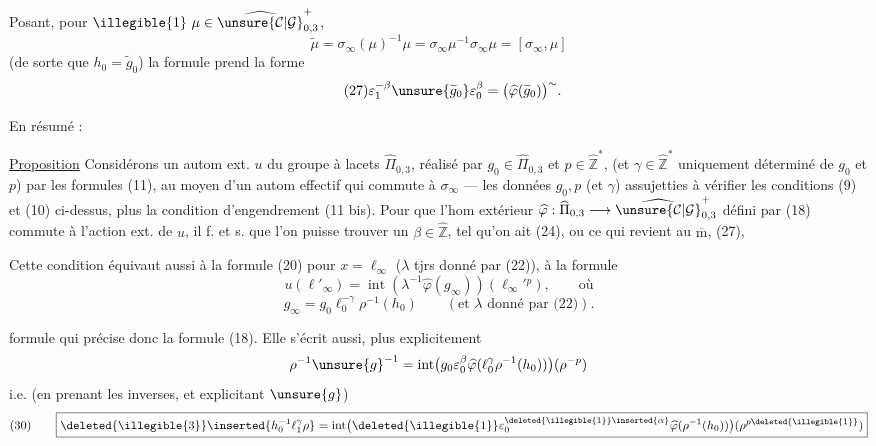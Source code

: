 Posant, pour $\illegible{1}\ \mu\in
\widehat{\unsure{\mathcal C|\mathcal G}}_{0,3}^{+}$,
\[
\tag{26}
\widetilde\mu=\sigma_\infty(\mu)^{-1}\mu
=\sigma_\infty\mu^{-1}\sigma_\infty\mu=[\sigma_\infty,\mu]
\]
(de sorte que $h_0=\widetilde g_0$) la formule  prend la forme
\[
\tag{27}
\varepsilon_1^{-\beta}\unsure{\widetilde g_0}\varepsilon_0^\beta
=\bigl(\widehat\varphi(\widetilde g_0)\bigr)^{\sim}.
\]


En résumé :

\uline{Proposition} Considérons un autom ext. $u$ du groupe à lacets
$\widehat\Pi_{0,3}$, réalisé par $g_0\in\widehat\Pi_{0,3}$
et $p\in\widehat{\mathbb Z}^{*}$,
(et $\gamma\in\widehat{\mathbb Z}^{*}$ uniquement déterminé
 de $g_0$ et $p$)
par les formules (11), au moyen d'un autom effectif
 qui commute à $\sigma_\infty$ ---
les données $g_0,p$ (et $\gamma$)  
assujetties à vérifier les conditions (9) et (10) ci-dessus,
plus la condition d'engendrement (11 bis).
Pour que l'hom extérieur
$\widehat\varphi:\widehat\Pi_{0,3}\longrightarrow
\widehat{\unsure{\mathcal C|\mathcal G}}_{0,3}^{+}$
défini par (18) commute à l'action ext. de $u$,
il f. et s. que l'on puisse trouver un $\beta\in\widehat{\mathbb Z}$,
tel qu'on ait (24), ou ce qui revient au $\overline{\mathrm m}$, (27),

Cette condition  équivaut aussi à la formule
(20) pour $x=\ell_\infty$ ($\lambda$  tjrs donné par (22)),
  à la formule
\[
\tag{28}
u(\ell'_\infty)=\operatorname{int}(\lambda^{-1}\widehat\varphi(g_\infty))
 (\ell_\infty'{}^p),\qquad\text{où}
\]
\[
\tag{29}
g_\infty=g_0\ell_0^{-\gamma}\rho^{-1}(h_0)
\qquad(\text{et }\lambda\text{ donné par (22)}).
\]


formule qui précise donc la formule  (18). Elle s'écrit aussi, plus explicitement
\[
\rho^{-1}\unsure{g}^{-1}
=\operatorname{int}\bigl(g_0\varepsilon_0^{\beta}
\widehat\varphi(\ell_0^{\gamma}\rho^{-1}(h_0))\bigr)
(\rho^{-p})
\]
i.e. (en prenant les inverses, et explicitant $\unsure{g}$)
\[
(30)\qquad
\boxed{
\deleted{\illegible{3}}\inserted{h_0^{-1}\ell_1^{\gamma}\rho}
=\operatorname{int}\bigl(
\deleted{\illegible{1}}\varepsilon_0^{\deleted{\illegible{1}}\inserted{\alpha}}
\widehat\varphi(\rho^{-1}(h_0))\bigr)
(\rho^{p\deleted{\illegible{1}}})
}
\]

